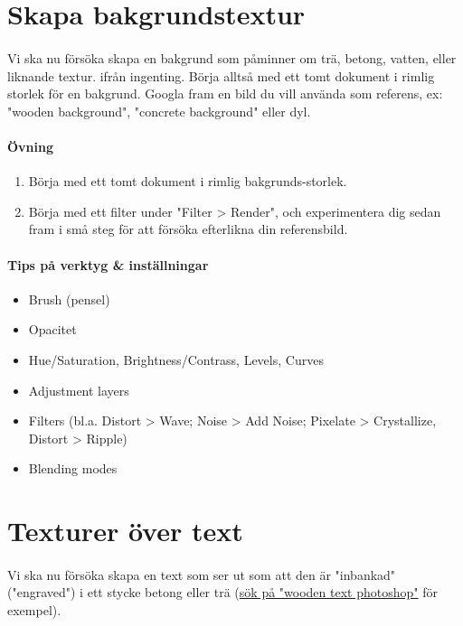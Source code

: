 \documentclass{article}
\begin{document}
  \section{Skapa bakgrundstextur}
    \paragraph{}
    Vi ska nu försöka skapa en bakgrund som påminner om trä, betong, vatten, eller liknande textur. ifrån ingenting. Börja alltså med ett tomt dokument i rimlig storlek för en bakgrund. Googla fram en bild du vill använda som referens, ex: "wooden background", "concrete background" eller dyl.

    \paragraph{Övning}
      \begin{enumerate}
        \item Börja med ett tomt dokument i rimlig bakgrunds-storlek.
        \item Börja med ett filter under "Filter > Render", och experimentera dig sedan fram i små steg för att försöka efterlikna din referensbild.
      \end{enumerate}

    \paragraph{Tips på verktyg \& inställningar}
      \begin{itemize}
        \item Brush (pensel)
        \item Opacitet
        \item Hue/Saturation, Brightness/Contrass, Levels, Curves
        \item Adjustment layers
        \item Filters (bl.a. Distort > Wave; Noise > Add Noise; Pixelate > Crystallize, Distort > Ripple)
        \item Blending modes
      \end{itemize}


  \section{ Texturer över text}
    \paragraph{}
    Vi ska nu försöka skapa en text som ser ut som att den är "inbankad" ("engraved") i ett stycke betong eller trä (\href{https://www.google.se/search?q=engraved+text+photoshop&um=1&ie=UTF-8&hl=sv&tbm=isch&source=og&sa=N&tab=wi&ei=xK4lUsD7DNSQhQep94CYBQ&biw=1280&bih=679&sei=xq4lUuefCMGJhQfghYCoAw#hl=sv&q=wooden+text+photoshop&tbm=isch&um=1}{sök på "wooden text photoshop"} för exempel). 
\end{document}

